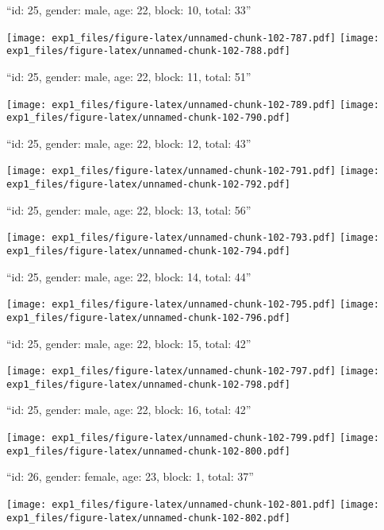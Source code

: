 \documentclass[11pt,,]{article}
\begin{document}
\newpage
[1] 

``id: 25, gender: male, age: 22, block: 10, total: 33''

\texttt{[image: exp1\_files/figure-latex/unnamed-chunk-102-787.pdf]}
\texttt{[image: exp1\_files/figure-latex/unnamed-chunk-102-788.pdf]}

\newpage
[1] 

``id: 25, gender: male, age: 22, block: 11, total: 51''

\texttt{[image: exp1\_files/figure-latex/unnamed-chunk-102-789.pdf]}
\texttt{[image: exp1\_files/figure-latex/unnamed-chunk-102-790.pdf]}

\newpage
[1] 

``id: 25, gender: male, age: 22, block: 12, total: 43''

\texttt{[image: exp1\_files/figure-latex/unnamed-chunk-102-791.pdf]}
\texttt{[image: exp1\_files/figure-latex/unnamed-chunk-102-792.pdf]}

\newpage
[1] 

``id: 25, gender: male, age: 22, block: 13, total: 56''

\texttt{[image: exp1\_files/figure-latex/unnamed-chunk-102-793.pdf]}
\texttt{[image: exp1\_files/figure-latex/unnamed-chunk-102-794.pdf]}

\newpage
[1] 

``id: 25, gender: male, age: 22, block: 14, total: 44''

\texttt{[image: exp1\_files/figure-latex/unnamed-chunk-102-795.pdf]}
\texttt{[image: exp1\_files/figure-latex/unnamed-chunk-102-796.pdf]}

\newpage
[1] 

``id: 25, gender: male, age: 22, block: 15, total: 42''

\texttt{[image: exp1\_files/figure-latex/unnamed-chunk-102-797.pdf]}
\texttt{[image: exp1\_files/figure-latex/unnamed-chunk-102-798.pdf]}

\newpage
[1] 

``id: 25, gender: male, age: 22, block: 16, total: 42''

\texttt{[image: exp1\_files/figure-latex/unnamed-chunk-102-799.pdf]}
\texttt{[image: exp1\_files/figure-latex/unnamed-chunk-102-800.pdf]}

\newpage
[1] 

``id: 26, gender: female, age: 23, block: 1, total: 37''

\texttt{[image: exp1\_files/figure-latex/unnamed-chunk-102-801.pdf]}
\texttt{[image: exp1\_files/figure-latex/unnamed-chunk-102-802.pdf]}
\end{document}
